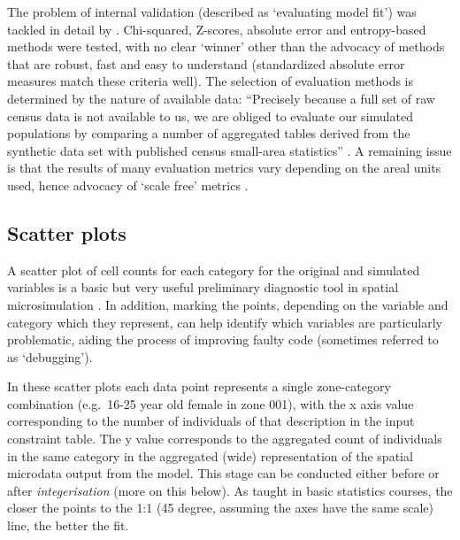 \documentclass[a4paper,10pt]{article}
\begin{document}
The problem of internal validation
(described as `evaluating model fit') was tackled in detail by \citet{Voas2001}.
Chi-squared, Z-scores, absolute error and entropy-based methods
were tested, with no clear `winner' other than the advocacy of
methods that are robust, fast and easy to understand (standardized absolute
error measures match these criteria well).
The selection of evaluation methods is determined by
the nature of available data:
``Precisely because a full set of raw census data is not
available to us, we are obliged to evaluate our simulated populations by comparing
a number of aggregated tables derived from the synthetic data set with published
census small-area statistics'' \citep[p.~178]{Voas2001}.
A remaining issue is that the results of many evaluation metrics vary depending
on the areal units used, hence advocacy of `scale free' metrics \citep{Malleson2012}	.

% 
 

\subsection{Scatter plots}
A scatter plot of cell counts for each category for the original and simulated variables is
a basic but very useful preliminary diagnostic tool in spatial microsimulation
\citep{Ballas2005c,Edwards2009}.
In addition, marking the points, depending on the
variable and category %
which they represent, can help identify which variables are particularly problematic,
aiding the process of improving faulty code (sometimes referred to as `debugging').

In these scatter plots each data point represents a single zone-category
combination (e.g.~16-25 year old female in zone 001), with the x axis value corresponding
to the number of individuals of that description in the input constraint table.
The y value corresponds to the
aggregated count of individuals in the same category in the aggregated
(wide) representation of the spatial microdata output from the model. %
This stage can be conducted either before or after \emph{integerisation}
(more on this below). As taught in basic statistics courses, the closer the points to the
1:1 (45 degree, assuming the axes have the same scale) line, the better the fit.
\end{document}
